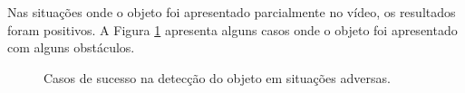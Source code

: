 Nas situações onde o objeto foi apresentado parcialmente no vídeo, os resultados foram positivos. A Figura \ref{img:res_complexo_obst} apresenta alguns casos onde o objeto foi apresentado com alguns obstáculos.

\begin{figure}[H]
	\centering
	\hspace{3em}
	\caption{Casos de sucesso na detecção do objeto em situações adversas.}
	\label{img:res_complexo_obst}
\end{figure}

